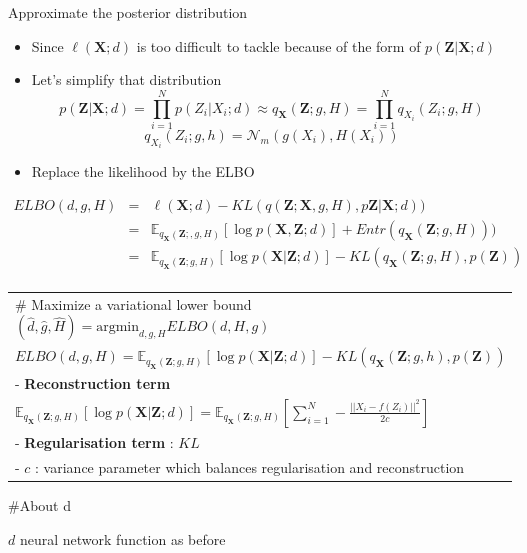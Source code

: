\documentclass[
  12pt,
  ignorenonframetext,
  compress]{beamer}
\begin{document}
\begin{frame}{Approximate the posterior distribution}
\begin{itemize}
\item
  Since \(\ell(\mathbf{X}; d)\) is too difficult to tackle because of
  the form of \(p(\mathbf{Z} | \mathbf{X}; d)\)
\item
  Let's simplify that distribution
  \[p(\mathbf{Z}  | \mathbf{X};d) = \prod_{i=1}^{N} p(Z_i |  X_i; d)  \approx q_{\mathbf{X}}(\mathbf{Z};g,H)  = \prod_{i=1}^{N} q_{ X_i}(Z_i;g,H)\]
  \[q_{X_i}(Z_i;g,h) =\mathcal{N}_m(g(X_i),H(X_i))\]
\item
  Replace the likelihood by the ELBO
\end{itemize}

\[
\begin{eqnarray}
 ELBO(d,g,H) &=&\ell(\mathbf{X}; d)-  KL(q(\mathbf{Z};\mathbf{X},g,H), p\mathbf{Z} |\mathbf{X};d))\\
 &=&\mathbb{E}_{q_{\mathbf{X}}(\mathbf{Z}; ,g,H)}[\log p(\mathbf{X} , \mathbf{Z};d)] + Entr(q_{\mathbf{X}}(\mathbf{Z};g,H)))\\
 &=& \mathbb{E}_{q_{\mathbf{X}}(\mathbf{Z};g,H)}[\log p(\mathbf{X} | \mathbf{Z};d)]- KL(q_{\mathbf{X}}(\mathbf{Z};g,H), p(\mathbf{Z}))\\
\end{eqnarray}
 \]

\begin{longtable}[]{@{}
  >{\raggedright\arraybackslash}p{}@{}}
\toprule
\endhead
\# Maximize a variational lower bound
\((\hat{d},\hat{g},\hat{H}) = \mbox{argmin}_{d,g,H} ELBO(d,H,g)\) \\
\(ELBO(d,g,H)  = \mathbb{E}_{q_{\mathbf{X}}(\mathbf{Z};g,H)}[\log p(\mathbf{X} | \mathbf{Z};d)]- KL(q_{\mathbf{X}}(\mathbf{Z};g,h), p(\mathbf{Z}))\) \\
- \textbf{Reconstruction term} \\
\(\mathbb{E}_{q_{\mathbf{X}}(\mathbf{Z};g,H)}[\log p(\mathbf{X} | \mathbf{Z};d)] = \mathbb{E}_{q_{\mathbf{X}}(\mathbf{Z};g,H)}  \left[\sum_{i=1}^N - \frac{||X_i - f(Z_i)||^2}{2c}\right]\) \\
- \textbf{Regularisation term} : \(KL\) \\
- \(c\) : variance parameter which balances regularisation and
reconstruction \\
\bottomrule
\end{longtable}

\#About d

\(d\) neural network function as before
\end{frame}
\end{document}

